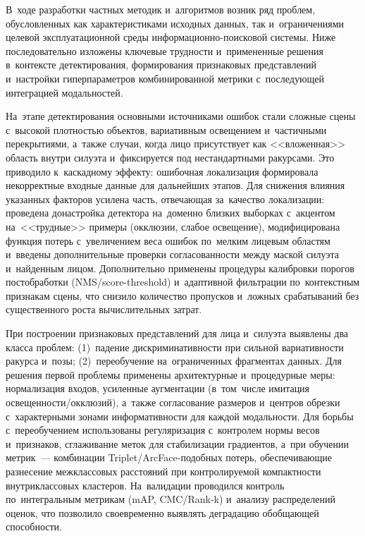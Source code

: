 В~ходе разработки частных методик и~алгоритмов возник ряд проблем,
обусловленных как характеристиками исходных данных, так
и~ограничениями целевой эксплуатационной среды
информационно-поисковой системы. Ниже последовательно изложены
ключевые трудности и~примененные решения в~контексте детектирования,
формирования признаковых представлений и~настройки гиперпараметров
комбинированной метрики с~последующей интеграцией модальностей.

На~этапе детектирования основными источниками ошибок стали сложные
сцены с~высокой плотностью объектов, вариативным освещением
и~частичными перекрытиями, а~также случаи, когда лицо присутствует
как <<вложенная>> область внутри силуэта и~фиксируется под
нестандартными ракурсами. Это приводило к~каскадному эффекту:
ошибочная локализация формировала некорректные входные данные для
дальнейших этапов. Для снижения влияния указанных факторов усилена
часть, отвечающая за~качество локализации: проведена донастройка
детектора на~доменно близких выборках с~акцентом на~<<трудные>>
примеры (окклюзии, слабое освещение), модифицирована функция потерь
с~увеличением веса ошибок по~мелким лицевым областям и~введены
дополнительные проверки согласованности между маской силуэта
и~найденным лицом. Дополнительно применены процедуры калибровки
порогов постобработки (NMS/score-threshold) и~адаптивной фильтрации
по~контекстным признакам сцены, что снизило количество пропусков
и~ложных срабатываний без существенного роста вычислительных затрат.

При построении признаковых представлений для лица и~силуэта выявлены
два класса проблем: (1)~падение дискриминативности при сильной
вариативности ракурса и~позы; (2)~переобучение на~ограниченных
фрагментах данных. Для решения первой проблемы применены архитектурные
и~процедурные меры: нормализация входов, усиленные аугментации
(в~том~числе имитация освещенности/окклюзий), а~также согласование
размеров и~центров обрезки с~характерными зонами
информативности для каждой модальности. Для борьбы с~переобучением
использованы регуляризация с~контролем нормы весов и~признаков,
сглаживание меток для стабилизации градиентов, а~при обучении метрик~---
комбинации Triplet/ArcFace-подобных потерь, обеспечивающие разнесение
межклассовых расстояний при контролируемой компактности
внутриклассовых кластеров. На~валидации проводился контроль
по~интегральным метрикам (mAP, CMC/Rank-k) и~анализу распределений
оценок, что позволило своевременно выявлять деградацию обобщающей
способности.

